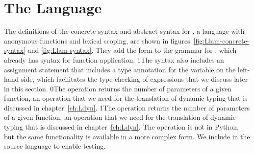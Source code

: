 \documentclass[7x10]{TimesAPriori_MIT}%
\def\racketEd{0}
\def\pythonEd{1}
\providecommand{\BookEdition}{1}
\let\edition\BookEdition
\newcommand{\racket}[1]{{\if\edition\racketEd{#1}\fi}}
\newcommand{\pythonColor}[0]{}
\newcommand{\python}[1]{{\if\edition\pythonEd\pythonColor #1\fi}}
\numberwithin{theorem}{chapter}
\numberwithin{definition}{chapter}
\numberwithin{equation}{chapter}
\begin{document}
\section{The \LangLam{} Language}
\label{sec:r5}

The definitions of the concrete syntax and abstract syntax for
\LangLam{}, a language with anonymous functions and lexical scoping,
are shown in figures~\ref{fig:Llam-concrete-syntax} and
\ref{fig:Llam-syntax}. They add the  form to the grammar
for \LangFun{}, which already has syntax for function application.
%
\python{The syntax also includes an assignment statement that includes
  a type annotation for the variable on the left-hand side, which
  facilitates the type checking of \code{lambda} expressions that we
  discuss later in this section.}
%
\racket{The  operation returns the number of parameters
  of a given function, an operation that we need for the translation
  of dynamic typing that is discussed in chapter~\ref{ch:Ldyn}.}
%
\python{The  operation returns the number of parameters of
  a given function, an operation that we need for the translation
  of dynamic typing that is discussed in chapter~\ref{ch:Ldyn}.
  The \code{arity} operation is not in Python, but the same functionality
  is available in a more complex form. We include \code{arity} in the
  \LangLam{} source language to enable testing.}

\newcommand{\LlambdaGrammarRacket}{
  \begin{array}{lcl}
  \Exp &::=&  \CLAMBDA{\LP\LS\Var \key{:} \Type\RS\ldots\RP}{\Type}{\Exp} \\
    &\MID& \LP \key{procedure-arity}~\Exp\RP
  \end{array}
}
\newcommand{\LlambdaASTRacket}{
  \begin{array}{lcl}
  \Exp &::=& \LAMBDA{\LP\LS\Var\code{:}\Type\RS\ldots\RP}{\Type}{\Exp}\\
  \itm{op} &::=& \code{procedure-arity} 
  \end{array}
}

\newcommand{\LlambdaGrammarPython}{
  \begin{array}{lcl}
  \Exp &::=& \CLAMBDA{\Var\code{, }\ldots}{\Exp} \MID \CARITY{\Exp} \\
  \Stmt &::=& \CANNASSIGN{\Var}{\Type}{\Exp}
  \end{array}
}

\newcommand{\LlambdaASTPython}{
  \begin{array}{lcl}
  \Exp &::=& \LAMBDA{\Var^{*}}{\Exp} \MID \ARITY{\Exp} \\
  \Stmt &::=& \ANNASSIGN{\Var}{\Type}{\Exp}
  \end{array}
}
\end{document}
